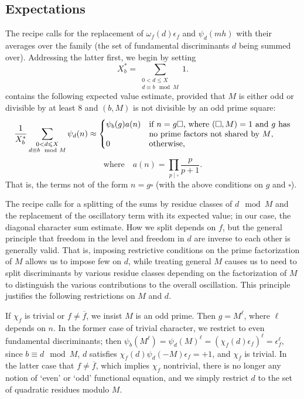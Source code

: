 \documentclass[11pt,reqno]{amsart} \usepackage{fullpage}
\renewcommand{\leq}{\leqslant}
\newcommand{\ep}{\epsilon}
\renewcommand{\d}[1]{\,\operatorname*{d}\!{#1}}
\newcommand\be{\begin{equation}}
\newcommand\ee{\end{equation}}
\numberwithin{equation}{section}
\begin{document}
\subsection{Expectations}\label{sec:expectations}
The recipe calls for the replacement of $\omega_f(d)\ep_f$ and $\psi_d(mh)$ with their
averages over the family (the set of fundamental discriminants $d$ being summed over).
Addressing the latter first, we begin by setting
\be X^*_b = \sum_{\substack{0<d\leq X\\d\equiv b\mod M}} 1.\ee
\cite[Theorem 3.1.1]{recipe} contains the following expected value estimate,
provided that $M$ is either odd or divisible by at least 8 and $(b,M)$ is not
divisible by an odd prime square:
\be\label{eq:charexpect}
\frac1{X^*_b}\sum_{\substack{0<d\leq X\\d\equiv b\mod M}}\psi_d(n)
\approx
\begin{cases}
  \psi_b(g)a(n) & \parbox[t]{0.5\textwidth}{if $n=g\square$, where
    $(\square,M)=1$ and $g$ has no prime factors not shared by $M$,} \\
  0 & \text{otherwise,}
\end{cases}\ee
\begin{equation*}
\text{where}\quad a(n)=\prod_{p\mid\square}\frac{p}{p+1}.
\end{equation*}
That is, the terms not of the form $n=g\square$ (with the above conditions on
$g$ and $\square$).

The recipe calls for a splitting of the sums by residue classes of $d\mod M$ and the
replacement of the oscillatory term with its expected value; in our case, the diagonal
character sum estimate. How we split depends on $f$, but the general principle that
freedom in the level and freedom in $d$ are inverse to each other is generally valid.
That is, imposing restrictive conditions on the prime factorization of $M$ allows us to
impose few on $d$, while treating general $M$ causes us to need to split discriminants by
various residue classes depending on the factorization of $M$ to distinguish the various
contributions to the overall oscillation. This principle justifies the following
restrictions on $M$ and $d$.

If $\chi_f$ is trivial or $f\ne\overline f$, we insist $M$ is an odd prime.
Then $g=M^\ell$,
where $\ell$ depends on $n$. In the former case of trivial character, we restrict to even
fundamental discriminants; then
$\psi_b(M^\ell)=\psi_d(M)^\ell=\left(\chi_f(d)\ep_f\right)^\ell=\ep_f^\ell$, since
$b\equiv d\mod M$, $d$ satisfies $\chi_f(d)\psi_d(-M)\ep_f=+1$, and $\chi_f$ is trivial.
In the latter case that $f\ne\overline f$, which implies $\chi_f$ nontrivial, there is
no longer any notion of `even' or `odd' functional equation, and we simply restrict $d$
to the set of quadratic residues modulo $M$.
\end{document}
